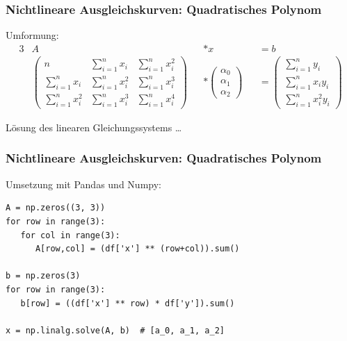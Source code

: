 \begin{frame}
\frametitle{Nichtlineare Ausgleichskurven: Quadratisches Polynom}

Umformung:
\setcounter{equation}{0}
\begin{alignat*}{3}
& A &&* x &&= b \\
& \begin{pmatrix}
	n & \sum_{i=1}^{n} x_i & \sum_{i=1}^{n} x_i^2 \\
	\sum_{i=1}^{n} x_i & \sum_{i=1}^{n} x_i^2 & \sum_{i=1}^{n} x_i^3 \\
	\sum_{i=1}^{n} x_i^2 & \sum_{i=1}^{n} x_i^3 & \sum_{i=1}^{n} x_i^4
\end{pmatrix} &&* \begin{pmatrix}
	\alpha_0 \\
	\alpha_1 \\
	\alpha_2
\end{pmatrix} &&= \begin{pmatrix}
	\sum_{i=1}^{n} y_i \\
	\sum_{i=1}^{n} x_i y_i \\
	\sum_{i=1}^{n} x_i^2 y_i
\end{pmatrix}
\end{alignat*}

\vspace{1cm}

Lösung des linearen Gleichungssystems \dots

\end{frame}


\begin{frame}[fragile]
\frametitle{Nichtlineare Ausgleichskurven: Quadratisches Polynom}

Umsetzung mit Pandas und Numpy:

\begin{verbatim}
A = np.zeros((3, 3))
for row in range(3):
   for col in range(3):
      A[row,col] = (df['x'] ** (row+col)).sum()

b = np.zeros(3)
for row in range(3):
   b[row] = ((df['x'] ** row) * df['y']).sum()

x = np.linalg.solve(A, b)  # [a_0, a_1, a_2]
\end{verbatim}

\end{frame}


